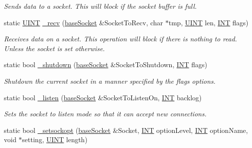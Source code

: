 \begin{DoxyCompactItemize}
\begin{DoxyCompactList}\small\item\em Sends data to a socket. This will block if the socket buffer is full. \end{DoxyCompactList}\item 
static \hyperlink{typedefs_8h_a2e2c38961834f28c06e17e074eb00bc7}{U\+I\+N\+T} \hyperlink{class_communication_1_1_o_s_a1eaa3e210f77c5b06bc818723595a0e4}{\+\_\+recv} (\hyperlink{class_communication_1_1base_socket}{base\+Socket} \&Socket\+To\+Recv, char $\ast$tmp, \hyperlink{typedefs_8h_a2e2c38961834f28c06e17e074eb00bc7}{U\+I\+N\+T} len, \hyperlink{typedefs_8h_a0240b856f74f8905ed334a5a0ca624e5}{I\+N\+T} flags)
\begin{DoxyCompactList}\small\item\em Receives data on a socket. This operation will block if there is nothing to read. Unless the socket is set otherwise. \end{DoxyCompactList}\item 
static bool \hyperlink{class_communication_1_1_o_s_a48497a56e399c71521402474881c1a91}{\+\_\+shutdown} (\hyperlink{class_communication_1_1base_socket}{base\+Socket} \&Socket\+To\+Shutdown, \hyperlink{typedefs_8h_a0240b856f74f8905ed334a5a0ca624e5}{I\+N\+T} flags)
\begin{DoxyCompactList}\small\item\em Shutdown the current socket in a manner specified by the flags options. \end{DoxyCompactList}\item 
static bool \hyperlink{class_communication_1_1_o_s_add79085b739cd0b0f7300f10eee920c5}{\+\_\+listen} (\hyperlink{class_communication_1_1base_socket}{base\+Socket} \&Socket\+To\+Listen\+On, \hyperlink{typedefs_8h_a0240b856f74f8905ed334a5a0ca624e5}{I\+N\+T} backlog)
\begin{DoxyCompactList}\small\item\em Sets the socket to listen mode so that it can accept new connections. \end{DoxyCompactList}\item 
static bool \hyperlink{class_communication_1_1_o_s_a346bdb63997895b796df07e0484cc466}{\+\_\+setsockopt} (\hyperlink{class_communication_1_1base_socket}{base\+Socket} \&Socket, \hyperlink{typedefs_8h_a0240b856f74f8905ed334a5a0ca624e5}{I\+N\+T} option\+Level, \hyperlink{typedefs_8h_a0240b856f74f8905ed334a5a0ca624e5}{I\+N\+T} option\+Name, void $\ast$setting, \hyperlink{typedefs_8h_a2e2c38961834f28c06e17e074eb00bc7}{U\+I\+N\+T} length)

\end{DoxyCompactItemize}
